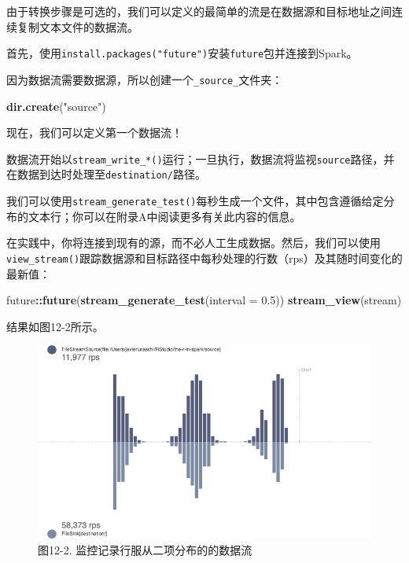 \documentclass[
]{article}
\newenvironment{Shaded}{\begin{snugshade}}{\end{snugshade}}
\newcommand{\DataTypeTok}[1]{\textcolor[rgb]{0.13,0.29,0.53}{#1}}
\newcommand{\FloatTok}[1]{\textcolor[rgb]{0.00,0.00,0.81}{#1}}
\newcommand{\KeywordTok}[1]{\textcolor[rgb]{0.13,0.29,0.53}{\textbf{#1}}}
\newcommand{\NormalTok}[1]{#1}
\newcommand{\OperatorTok}[1]{\textcolor[rgb]{0.81,0.36,0.00}{\textbf{#1}}}
\newcommand{\StringTok}[1]{\textcolor[rgb]{0.31,0.60,0.02}{#1}}
\begin{document}
由于转换步骤是可选的，我们可以定义的最简单的流是在数据源和目标地址之间连续复制文本文件的数据流。

首先，使用\texttt{install.packages("future")}安装\texttt{future}包并连接到Spark。

因为数据流需要数据源，所以创建一个\texttt{\_source\_}文件夹：

\begin{Shaded}
\begin{Highlighting}[]
\KeywordTok{dir.create}\NormalTok{(}\StringTok{"source"}\NormalTok{)}
\end{Highlighting}
\end{Shaded}

现在，我们可以定义第一个数据流！

\begin{Shaded}
\end{Shaded}

数据流开始以\texttt{stream\_write\_*()}运行；一旦执行，数据流将监视\texttt{source}路径，并在数据到达时处理至\texttt{destination/}路径。

我们可以使用\texttt{stream\_generate\_test()}每秒生成一个文件，其中包含遵循给定分布的文本行；你可以在附录A中阅读更多有关此内容的信息。

在实践中，你将连接到现有的源，而不必人工生成数据。然后，我们可以使用\texttt{view\_stream()}跟踪数据源和目标路径中每秒处理的行数（rps）及其随时间变化的最新值：

\begin{Shaded}
\begin{Highlighting}[]
\NormalTok{future}\OperatorTok{::}\KeywordTok{future}\NormalTok{(}\KeywordTok{stream_generate_test}\NormalTok{(}\DataTypeTok{interval =} \FloatTok{0.5}\NormalTok{))}
\KeywordTok{stream_view}\NormalTok{(stream)}
\end{Highlighting}
\end{Shaded}

结果如图12-2所示。

\begin{figure}
\centering
\includegraphics{figures/12_2.png}
\caption{图12-2. 监控记录行服从二项分布的的数据流}
\end{figure}
\end{document}
